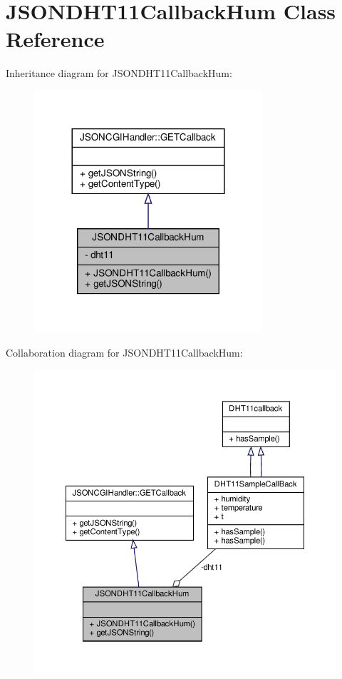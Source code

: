 \hypertarget{classJSONDHT11CallbackHum}{}\section{J\+S\+O\+N\+D\+H\+T11\+Callback\+Hum Class Reference}
\label{classJSONDHT11CallbackHum}


Inheritance diagram for J\+S\+O\+N\+D\+H\+T11\+Callback\+Hum\+:
\nopagebreak
\begin{figure}[H]
\begin{center}
\leavevmode
\includegraphics[width=240pt]{classJSONDHT11CallbackHum__inherit__graph}
\end{center}
\end{figure}


Collaboration diagram for J\+S\+O\+N\+D\+H\+T11\+Callback\+Hum\+:
\nopagebreak
\begin{figure}[H]
\begin{center}
\leavevmode
\includegraphics[width=350pt]{classJSONDHT11CallbackHum__coll__graph}
\end{center}
\end{figure}
